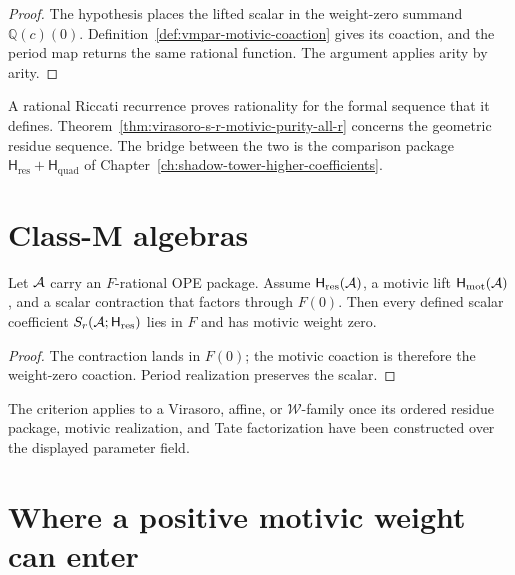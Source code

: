 \begin{proof}
The hypothesis places the lifted scalar in the weight-zero summand
\(\mathbb Q(c)(0)\).  Definition~\ref{def:vmpar-motivic-coaction}
gives its coaction, and the period map returns the same rational
function.  The argument applies arity by arity.
\end{proof}

\begin{remark}
\label{rem:vmpar-independence-from-riccati}
A rational Riccati recurrence proves rationality for the formal
sequence that it defines.  Theorem~\ref{thm:virasoro-s-r-motivic-purity-all-r}
concerns the geometric residue sequence.  The bridge between the two
is the comparison package
\(\mathsf H_{\mathrm{res}}+\mathsf H_{\mathrm{quad}}\) of
Chapter~\ref{ch:shadow-tower-higher-coefficients}.
\end{remark}

\section{Class-M algebras}
\label{sec:vmpar-class-m}

\begin{theorem}
\label{thm:class-M-motivic-purity-algebras-with-Q-rational-OPE}
\ClaimStatusConditional
Let \(\mathcal A\) carry an \(F\)-rational OPE package.  Assume
\(\mathsf H_{\mathrm{res}}(\mathcal A)\), a motivic lift
\(\mathsf H_{\mathrm{mot}}(\mathcal A)\), and a scalar contraction that
factors through \(F(0)\).  Then every defined scalar coefficient
\(S_r(\mathcal A;\mathsf H_{\mathrm{res}})\) lies in \(F\) and has motivic
weight zero.
\end{theorem}

\begin{proof}
The contraction lands in \(F(0)\); the motivic coaction is therefore
the weight-zero coaction.  Period realization preserves the scalar.
\end{proof}

\begin{corollary}
\label{cor:vmpar-concrete-Q-rational-families}
\ClaimStatusConditional
The criterion applies to a Virasoro, affine, or \(\mathcal W\)-family
once its ordered residue package, motivic realization, and Tate
factorization have been constructed over the displayed parameter
field.
\end{corollary}

\section{Where a positive motivic weight can enter}
\label{sec:vmpar-weight-of-mzv}

